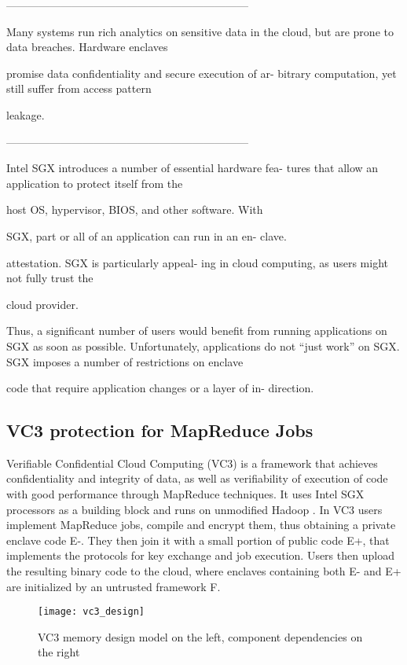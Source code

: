 ------------------------------------------------------------------

Many systems run rich analytics on sensitive data in the
cloud, but are prone to data breaches. Hardware enclaves

promise data confidentiality and secure execution of ar-
bitrary computation, yet still suffer from access pattern

leakage.

------------------------------------------------------------------

Intel SGX introduces a number of essential hardware fea-
tures that allow an application to protect itself from the

host OS, hypervisor, BIOS, and other software. With

SGX, part or all of an application can run in an en-
clave.

attestation. SGX is particularly appeal-
ing in cloud computing, as users might not fully trust the

cloud provider.

Thus, a significant number of users would benefit from
running applications on SGX as soon as possible.
Unfortunately, applications do not “just work” on
SGX. SGX imposes a number of restrictions on enclave

code that require application changes or a layer of in-
direction.

\subsection{VC3 protection for MapReduce Jobs}

Verifiable Confidential Cloud Computing (VC3) \cite{vc3Paper} is a framework that achieves confidentiality and integrity of data, as well as verifiability of execution of code with good performance through MapReduce \cite{mapReduce} techniques. It uses Intel SGX processors as a building block and runs on unmodified Hadoop \cite{hadoop}.
In VC3 users implement MapReduce jobs, compile and encrypt them, thus obtaining a private enclave code E-. They then join it with a small portion of public code E+, that implements the protocols for key exchange and job execution.
Users then upload the resulting binary code to the cloud, where enclaves containing both E- and E+ are initialized by an untrusted framework F. 

\begin{figure}[htbp]
	\centering
	{\texttt{[image: vc3\_design]}}%
	\caption{VC3 memory design model on the left, component dependencies on the right}
\end{figure}

